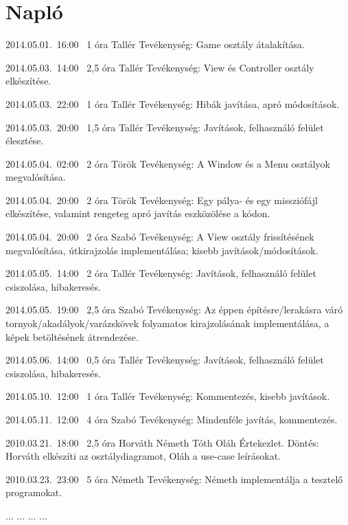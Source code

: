 %
\section{Napló}

\begin{naplo}

\bejegyzes
{2014.05.01.~16:00~}
{1 óra}
{Tallér}
{Tevékenység: Game osztály átalakítása.}

\bejegyzes
{2014.05.03.~14:00~}
{2,5 óra}
{Tallér}
{Tevékenység: View és Controller osztály elkészítése.}

\bejegyzes
{2014.05.03.~22:00~}
{1 óra}
{Tallér}
{Tevékenység: Hibák javítása, apró módosítások.}

\bejegyzes
{2014.05.03.~20:00~}
{1,5 óra}
{Tallér}
{Tevékenység: Javítások, felhasználó felület élesztése.}

\bejegyzes
{2014.05.04.~02:00~}
{2 óra}
{Török}
{Tevékenység: A Window és a Menu osztályok megvalósítása.}

\bejegyzes
{2014.05.04.~20:00~}
{2 óra}
{Török}
{Tevékenység: Egy pálya- és egy missziófájl elkészítése, valamint rengeteg apró javítás eszközölése a kódon.}

\bejegyzes
{2014.05.04.~20:00~}
{2 óra}
{Szabó}
{Tevékenység: A View osztály frissítésének megvalósítása, útkirajzolás implementálása; kisebb javítások/módosítások.}

\bejegyzes
{2014.05.05.~14:00~}
{2 óra}
{Tallér}
{Tevékenység: Javítások, felhasználó felület csiszolása, hibakeresés.}

\bejegyzes
{2014.05.05.~19:00~}
{2,5 óra}
{Szabó}
{Tevékenység: Az éppen építésre/lerakásra váró tornyok/akadályok/varázskövek folyamatos kirajzolásának implementálása, a képek betöltésének átrendezése.}

\bejegyzes
{2014.05.06.~14:00~}
{0,5 óra}
{Tallér}
{Tevékenység: Javítások, felhasználó felület csiszolása, hibakeresés.}

\bejegyzes
{2014.05.10.~12:00~}
{1 óra}
{Tallér}
{Tevékenység: Kommentezés, kisebb javítások.}

\bejegyzes
{2014.05.11.~12:00~}
{4 óra}
{Szabó}
{Tevékenység: Mindenféle javítás, kommentezés.}

\bejegyzes
{2010.03.21.~18:00~} %
{2,5 óra} %
{Horváth\newline
Németh\newline
Tóth\newline
Oláh} %
{Értekezlet. Döntés: Horváth elkészíti az osztálydiagramot, Oláh a use-case leírásokat.} %

\bejegyzes
{2010.03.23.~23:00~}
{5 óra}
{Németh}
{Tevékenység: Németh implementálja a tesztelő programokat.}

\bejegyzes
{...}
{...}
{...}
{...}


\end{naplo}

